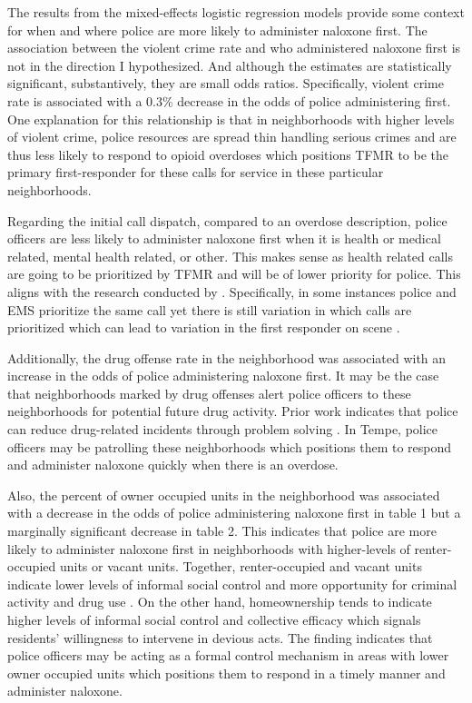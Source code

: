 The results from the mixed-effects logistic regression models provide some context for when and where police are more likely to administer naloxone first. The association between the violent crime rate and who administered naloxone first is not in the direction I hypothesized. And although the estimates are statistically significant, substantively, they are small odds ratios. Specifically, violent crime rate is associated with a 0.3\% decrease in the odds of police administering first. One explanation for this relationship is that in neighborhoods with higher levels of violent crime, police resources are spread thin handling serious crimes and are thus less likely to respond to opioid overdoses which positions TFMR to be the primary first-responder for these calls for service in these particular neighborhoods.

Regarding the initial call dispatch, compared to an overdose description, police officers are less likely to administer naloxone first when it is health or medical related, mental health related, or other. This makes sense as health related calls are going to be prioritized by TFMR and will be of lower priority for police. This aligns with the research conducted by \textcite{seim_bandage_2020}. Specifically, in some instances police and EMS prioritize the same call yet there is still variation in which calls are prioritized which can lead to variation in the first responder on scene \parencite{hibdon_concentration_2017}.

Additionally, the drug offense rate in the neighborhood was associated with an increase in the odds of police administering naloxone first. It may be the case that neighborhoods marked by drug offenses alert police officers to these neighborhoods for potential future drug activity. Prior work indicates that police can reduce drug-related incidents through problem solving \parencite{mazerolle_street-level_2007}. In Tempe, police officers may be patrolling these neighborhoods which positions them to respond and administer naloxone quickly when there is an overdose. 

Also, the percent of owner occupied units in the neighborhood was associated with a decrease in the odds of police administering naloxone first in table 1 but a marginally significant decrease in table 2. This indicates that police are more likely to administer naloxone first in neighborhoods with higher-levels of renter-occupied units or vacant units. Together, renter-occupied and vacant units indicate lower levels of informal social control and more opportunity for criminal activity and drug use \parencite{feldmeyer_community_2022, hannon_neighborhood_2006}. On the other hand, homeownership tends to indicate higher levels of informal social control and collective efficacy \parencite{sampson_neighborhoods_1997} which signals residents' willingness to intervene in devious acts. The finding indicates that police officers may be acting as a formal control mechanism in areas with lower owner occupied units which positions them to respond in a timely manner and administer naloxone.

